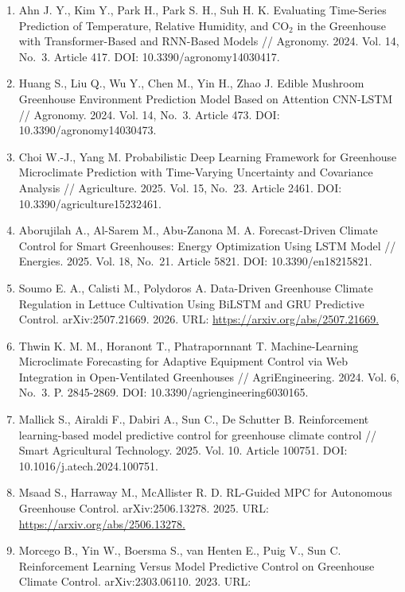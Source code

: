\documentclass[a4paper,14pt]{extarticle}
\begin{document}
\begin{enumerate}
  Based Prediction on Greenhouse Crop Yield Combined TCN and RNN //
  Sensors. 2021. Vol. 21, No.~13. Article 4537. DOI: 10.3390/s21134537.
\item
  Ahn J. Y., Kim Y., Park H., Park S. H., Suh H. K. Evaluating
  Time-Series Prediction of Temperature, Relative Humidity, and CO\(_2\)
  in the Greenhouse with Transformer-Based and RNN-Based Models //
  Agronomy. 2024. Vol. 14, No.~3. Article 417. DOI:
  10.3390/agronomy14030417.
\item
  Huang S., Liu Q., Wu Y., Chen M., Yin H., Zhao J. Edible Mushroom
  Greenhouse Environment Prediction Model Based on Attention CNN-LSTM //
  Agronomy. 2024. Vol. 14, No.~3. Article 473. DOI:
  10.3390/agronomy14030473.
\item
  Choi W.-J., Yang M. Probabilistic Deep Learning Framework for
  Greenhouse Microclimate Prediction with Time-Varying Uncertainty and
  Covariance Analysis // Agriculture. 2025. Vol. 15, No.~23. Article
  2461. DOI: 10.3390/agriculture15232461.
\item
  Aborujilah A., Al-Sarem M., Abu-Zanona M. A. Forecast-Driven Climate
  Control for Smart Greenhouses: Energy Optimization Using LSTM Model //
  Energies. 2025. Vol. 18, No.~21. Article 5821. DOI:
  10.3390/en18215821.
\item
  Soumo E. A., Calisti M., Polydoros A. Data-Driven Greenhouse Climate
  Regulation in Lettuce Cultivation Using BiLSTM and GRU Predictive
  Control. arXiv:2507.21669. 2026. URL:
  \url{https://arxiv.org/abs/2507.21669.}
\item
  Thwin K. M. M., Horanont T., Phatrapornnant T. Machine-Learning
  Microclimate Forecasting for Adaptive Equipment Control via Web
  Integration in Open-Ventilated Greenhouses // AgriEngineering. 2024.
  Vol. 6, No.~3. P. 2845-2869. DOI: 10.3390/agriengineering6030165.
\item
  Mallick S., Airaldi F., Dabiri A., Sun C., De Schutter B.
  Reinforcement learning-based model predictive control for greenhouse
  climate control // Smart Agricultural Technology. 2025. Vol. 10.
  Article 100751. DOI: 10.1016/j.atech.2024.100751.
\item
  Msaad S., Harraway M., McAllister R. D. RL-Guided MPC for Autonomous
  Greenhouse Control. arXiv:2506.13278. 2025. URL:
  \url{https://arxiv.org/abs/2506.13278.}
\item
  Morcego B., Yin W., Boersma S., van Henten E., Puig V., Sun C.
  Reinforcement Learning Versus Model Predictive Control on Greenhouse
  Climate Control. arXiv:2303.06110. 2023. URL:

\end{enumerate}
\end{document}
